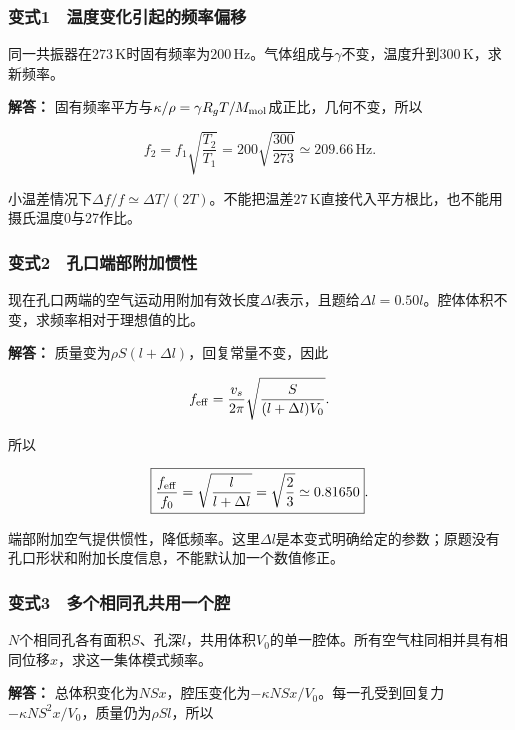 \documentclass[12pt,a4paper,fontset=fandol]{ctexart}
\begin{document}
\subsubsection{变式1　温度变化引起的频率偏移}\label{ux53d8ux5f0f1-ux6e29ux5ea6ux53d8ux5316ux5f15ux8d77ux7684ux9891ux7387ux504fux79fb}

同一共振器在\(273\,\mathrm K\)时固有频率为\(200\,\mathrm{Hz}\)。气体组成与\(\gamma\)不变，温度升到\(300\,\mathrm K\)，求新频率。

\textbf{解答：}
固有频率平方与\(\kappa/\rho=\gamma R_gT/M_{\rm mol}\)成正比，几何不变，所以

\[
\boxed{f_2=f_1\sqrt{\frac{T_2}{T_1}}
=200\sqrt{\frac{300}{273}}
\simeq209.66\,\mathrm{Hz}}.
\]

小温差情况下\(\Delta f/f\simeq\Delta T/(2T)\)。不能把温差\(27\,\mathrm K\)直接代入平方根比，也不能用摄氏温度0与27作比。

\subsubsection{变式2　孔口端部附加惯性}\label{ux53d8ux5f0f2-ux5b54ux53e3ux7aefux90e8ux9644ux52a0ux60efux6027}

现在孔口两端的空气运动用附加有效长度\(\Delta l\)表示，且题给\(\Delta l=0.50l\)。腔体体积不变，求频率相对于理想值的比。

\textbf{解答：} 质量变为\(\rho S(l+\Delta l)\)，回复常量不变，因此

\[
f_{\rm eff}=\frac{v_s}{2\pi}
\sqrt{\frac{S}{(l+\Delta l)V_0}}.
\]

所以

\[
\boxed{\frac{f_{\rm eff}}{f_0}
=\sqrt{\frac{l}{l+\Delta l}}
=\sqrt{\frac23}\simeq0.81650}.
\]

端部附加空气提供惯性，降低频率。这里\(\Delta l\)是本变式明确给定的参数；原题没有孔口形状和附加长度信息，不能默认加一个数值修正。

\subsubsection{变式3　多个相同孔共用一个腔}\label{ux53d8ux5f0f3-ux591aux4e2aux76f8ux540cux5b54ux5171ux7528ux4e00ux4e2aux8154}

\(N\)个相同孔各有面积\(S\)、孔深\(l\)，共用体积\(V_0\)的单一腔体。所有空气柱同相并具有相同位移\(x\)，求这一集体模式频率。

\textbf{解答：}
总体积变化为\(NSx\)，腔压变化为\(-\kappa NSx/V_0\)。每一孔受到回复力\(-\kappa NS^2x/V_0\)，质量仍为\(\rho Sl\)，所以
\end{document}
